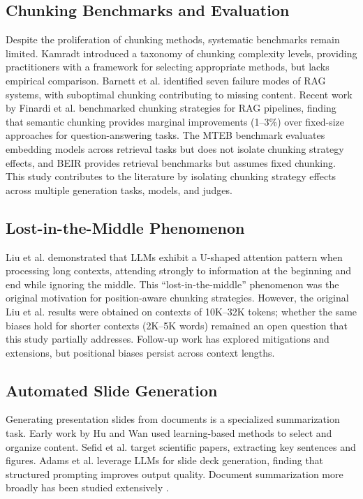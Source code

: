 \documentclass[journal]{IEEEtran}
\begin{document}
\subsection{Chunking Benchmarks and Evaluation}

Despite the proliferation of chunking methods, systematic benchmarks remain limited. Kamradt \cite{kamradt2024levels} introduced a taxonomy of chunking complexity levels, providing practitioners with a framework for selecting appropriate methods, but lacks empirical comparison. Barnett et al. \cite{barnett2024seven} identified seven failure modes of RAG systems, with suboptimal chunking contributing to missing content. Recent work by Finardi et al. \cite{finardi2024chronicles} benchmarked chunking strategies for RAG pipelines, finding that semantic chunking provides marginal improvements (1--3\%) over fixed-size approaches for question-answering tasks. The MTEB benchmark \cite{muennighoff2022mteb} evaluates embedding models across retrieval tasks but does not isolate chunking strategy effects, and BEIR \cite{thakur2021beir} provides retrieval benchmarks but assumes fixed chunking. This study contributes to the literature by isolating chunking strategy effects across multiple generation tasks, models, and judges.

\subsection{Lost-in-the-Middle Phenomenon}

Liu et al. \cite{liu2024lost} demonstrated that LLMs exhibit a U-shaped attention pattern when processing long contexts, attending strongly to information at the beginning and end while ignoring the middle. This ``lost-in-the-middle'' phenomenon was the original motivation for position-aware chunking strategies. However, the original Liu et al. results were obtained on contexts of 10K--32K tokens; whether the same biases hold for shorter contexts (2K--5K words) remained an open question that this study partially addresses. Follow-up work \cite{hsieh2024found, li2024longcontext, xiong2024effective} has explored mitigations and extensions, but positional biases persist across context lengths.

\subsection{Automated Slide Generation}

Generating presentation slides from documents is a specialized summarization task. Early work by Hu and Wan \cite{hu2014ppsgen} used learning-based methods to select and organize content. Sefid et al. \cite{sefid2019automatic} target scientific papers, extracting key sentences and figures. Adams et al. \cite{adams2023sparse} leverage LLMs for slide deck generation, finding that structured prompting improves output quality. Document summarization more broadly has been studied extensively \cite{zhang2020pegasus, goyal2022news}.
\end{document}
